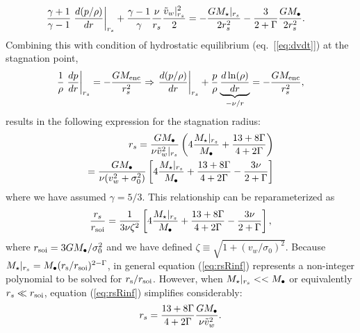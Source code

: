 \begin{align}
&\frac{\gamma+1}{\gamma-1}
\left.\frac{d (p/\rho)}{d r}\right|_{r_s}+ \frac{\gamma-1}{\gamma} \frac{\nu}{r_s} \frac{\tilde{v}_{w}|_{r_s}^{2}}{2} = -\frac{G
  M_{\star}|_{r_s}}{2 r_s^2} -\frac{3}{2+\Gamma} \frac{G M_{\bullet}}{2 r_s^2}.  \label{eq:rs1}
\end{align}
Combining this with condition of hydrostatic equilibrium (eq.~[\ref{eq:dvdt}]) at the stagnation point,
\begin{align}
\frac{1}{\rho}\left.\frac{d p}{d r}\right|_{r_s}=- \frac{GM_{\rm enc}}{r_s^2} \Rightarrow
\left.\frac{d (p/\rho)}{d r}\right|_{r_s} +\frac{p}{\rho}
\underbrace{\frac{d\ln(\rho)}{dr}}_{-\nu/r} = -\frac{G M_{\rm enc}}{r_s^2}, \label{eq:HSE}
\end{align}
results in the following expression for the stagnation radius:
\begin{align}
r_s=\frac{G M_{\bullet}}{\nu \tilde{v}_{w}^{2}|_{r_s}}\left(4
  \frac{M_{\star}|_{r_s}}{M_{\bullet}} +\frac{13+ 8\Gamma}{4+2\Gamma}\right) \nonumber \\
=\frac{G M_{\bullet}}{\nu (v_w^{2}+\sigma_0^2)}\left[4
    \frac{M_{\star}|_{r_s}}{M_{\bullet}} +\frac{13+ 8\Gamma}{4+2\Gamma}-\frac{3\nu }{2+\Gamma}\right]
\label{eq:rs2main}
\end{align}
where we have assumed $\gamma=5/3$.  This relationship can be reparameterized as
\begin{align}
  \frac{r_s}{r_{\rm soi}}=\frac{1}{3\nu \zeta^2} \left[4\frac{M_{\star}|_{r_s}}{M_{\bullet}} +\frac{13+8\Gamma}{4+2\Gamma}- \frac{3\nu }{2+\Gamma}\right],
  \label{eq:rsRinf}
\end{align}
where $r_{\rm soi}=3 G M_{\bullet}/\sigma_0^2$ and we have defined $\zeta \equiv \sqrt{1 + (v_w/\sigma_0)^2}$.  Because $M_{\star}|_{r_s} = M_{\bullet}(r_{\rm s}/r_{\rm soi})^{2-\Gamma}$, in general equation (\ref{eq:rsRinf}) represents a non-integer polynomial to be solved for $r_{\rm s}/r_{\rm soi}$.  However, when $M_{\star}|_{r_s} << M_{\bullet}$ or equivalently $r_s \ll r_{\rm soi}$, equation (\ref{eq:rsRinf}) simplifies considerably:
\begin{align}
r_s=\frac{13+8\Gamma}{4+2\Gamma} \frac{G M_{\bullet}}{\nu \tilde{v}_{w}^2}.
\end{align}
